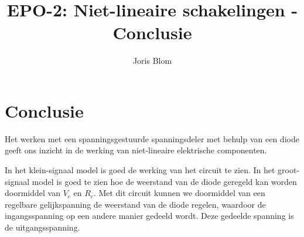 \documentclass{report}
\title{EPO-2: Niet-lineaire schakelingen - Conclusie}
\author{Joris Blom}
\begin{document}
\chapter{Conclusie}
\label{ch:conclusie}

Het werken met een spanningsgestuurde spanningsdeler met behulp van een diode geeft ons inzicht in de werking van niet-lineaire elektrische componenten.
 
In het klein-signaal model is goed de werking van het circuit te zien. In het groot-signaal model is goed te zien hoe de weerstand van de diode geregeld kan worden doormiddel van $V_c$ en $R_c$. Met dit circuit kunnen we doormiddel van een regelbare gelijkspanning de weerstand van de diode regelen, waardoor de ingangsspanning op een andere manier gedeeld wordt. Deze gedeelde spanning is de uitgangsspanning. 
\end{document}
